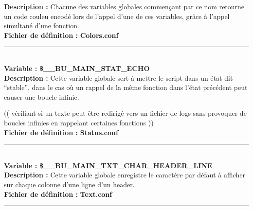 \documentclass[a4paper,10pt]{article}
\begin{document}
\textbf{Description :} Chacune des variables globales commençant par ce nom retourne un code couleu encodé lors de l'appel d'une de ces variables, grâce à l'appel simultané d'une fonction.\\[1\baselineskip]

\textbf{Fichier de définition :} \textbf{\color{lime}Colors.conf\color{white}}\\[1\baselineskip]



\color{orange}\par\noindent\rule{\textwidth}{0.4pt}\color{white}\\[1\baselineskip]
\textbf{Variable :} \textbf{\color{orange}\$\_\_BU\_MAIN\_STAT\_ECHO\color{white}}\\[1\baselineskip]

\textbf{Description :} Cette variable globale sert à mettre le script dans un état dit ``stable'', dans le cas où un rappel de la même fonction dans l'état précédent peut causer une boucle infinie.


(( vérifiant si un texte peut être redirigé vers un fichier de logs sans provoquer de boucles infinies en\linebreak
rappelant certaines fonctions ))
\\[1\baselineskip]

\textbf{Fichier de définition :} \textbf{\color{lime}Status.conf\color{white}}\\[1\baselineskip]



\color{orange}\par\noindent\rule{\textwidth}{0.4pt}\color{white}\\[1\baselineskip]

\textbf{Variable :} \textbf{\color{orange}\$\_\_BU\_MAIN\_TXT\_CHAR\_HEADER\_LINE\color{white}}\\[1\baselineskip]

\textbf{Description :} Cette variable globale enregistre le caractère par défaut à afficher sur chaque colonne d'une ligne d'un header.\\[1\baselineskip]

\textbf{Fichier de définition :} \textbf{\color{lime}Text.conf\color{white}}\\[1\baselineskip]



\color{red}\par\noindent\rule{\textwidth}{0.4pt}\color{white}

\color{red}
\end{document}
